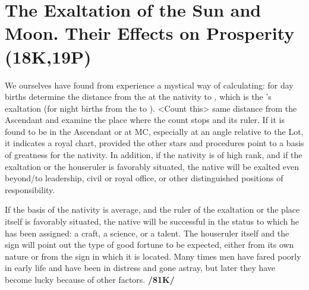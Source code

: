 \section{The Exaltation of the Sun and Moon. Their Effects on Prosperity (18K,19P)}

We ourselves have found from experience a mystical way of calculating: for day births determine the distance from the \Sun\xspace at the nativity to \Aries, which is the \Sun’s exaltation (for night births from the \Moon\xspace to \Taurus). <Count this> same distance from the Ascendant and examine the place where the count stops and its ruler. If it is found to be in the Ascendant or at MC, especially at an angle relative to the Lot, it
indicates a royal chart, provided the other stars and procedures point to a basis of greatness for the nativity. In addition, if the nativity is of high rank, and if the exaltation or the houseruler is favorably situated, the native will be exalted even beyond/to leadership, civil or royal office, or other distinguished positions of responsibility. 

If the basis of the nativity is average, and the ruler of the exaltation or the place itself is favorably situated, the native will be successful in the status to which he has been assigned: a craft, a science, or a talent. The houseruler itself and the sign will point out the type of good fortune to be expected, either from its own nature or from the sign in which it is located. Many times men have fared poorly in early life and have been in distress and gone astray, but later they have become lucky because of other factors. \textbf{/81K/}

\newpage